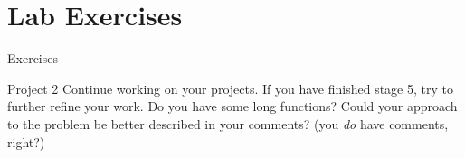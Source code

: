 \documentclass{beamer}
\begin{document}
\section{Lab Exercises}

\begin{frame}{Exercises}
    \begin{block}{Project 2}
        Continue working on your projects. If you have finished stage 5,
        try to further refine your work. Do you have some long functions?
        Could your approach to the problem be better described in your
        comments? (you \emph{do} have comments, right?)
    \end{block}
\end{frame}

%
%
%
%
%
%
%
%
%
%
%
%
%
%
%
%
%
%
%
%
%
\end{document}
